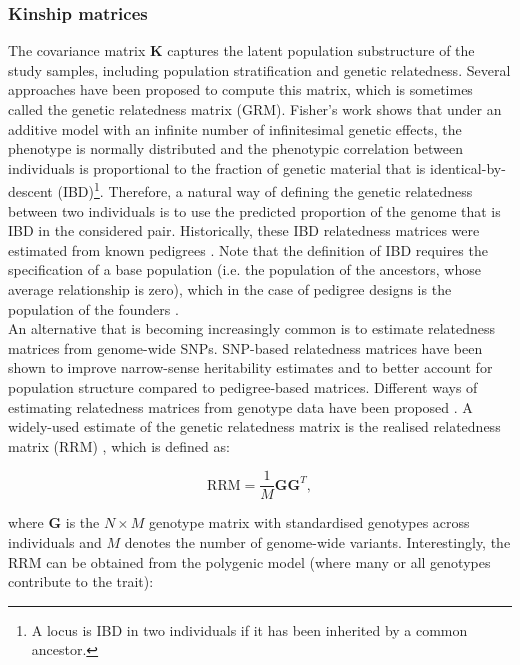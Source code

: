 \subsubsection{Kinship matrices}
\label{sec:kinship_matrices}

The covariance matrix $\mathbf{K}$ captures the latent population substructure of the study samples, including population stratification and genetic relatedness.
Several approaches have been proposed to compute this matrix, which is sometimes called the genetic relatedness matrix (GRM).
Fisher’s work \cite{fisher1919xv} shows that under an additive model with an infinite number of infinitesimal genetic effects, the phenotype is normally distributed and the phenotypic correlation between individuals is proportional to the fraction of genetic material that is identical-by-descent (IBD)\footnote{A locus is IBD in two individuals if it has been inherited by a common ancestor.}. 
Therefore, a natural way of defining the genetic relatedness between two individuals is to use the predicted proportion of the genome that is IBD in the considered pair. 
Historically, these IBD relatedness matrices were estimated from known pedigrees \cite{lange1976extensions}. 
Note that the definition of IBD requires the specification of a base population (i.e. the population of the ancestors, whose average relationship is zero), which in the case of pedigree designs is the population of the founders \cite{powell2010reconciling}.\\

An alternative that is becoming increasingly common is to estimate relatedness matrices from genome-wide SNPs. 
SNP-based relatedness matrices have been shown to improve narrow-sense heritability estimates \cite{visscher2006assumption, visscher2007genome, hayes2009increased} and to better account for population structure \cite{kang2008efficient, lee2010using} compared to pedigree-based matrices. 
Different ways of estimating relatedness matrices from genotype data have been proposed \cite{oliehoek2006estimating, purcell2007plink, vanraden2008efficient}. 
A widely-used estimate of the genetic relatedness matrix is the realised relatedness matrix ($\mathrm{RRM}$) \cite{hayes2009increased}, which is defined as:

 \begin{equation}
    \mathrm{RRM} = \frac{1}{M}\mathbf{G}\mathbf{G}^T,
\end{equation}

where $\mathbf{G}$ is the $N \times M$ genotype matrix with standardised genotypes across individuals and $M$ denotes the number of genome-wide variants. 
Interestingly, the $\mathrm{RRM}$ can be obtained from the polygenic model (where many or all genotypes contribute to the trait):

